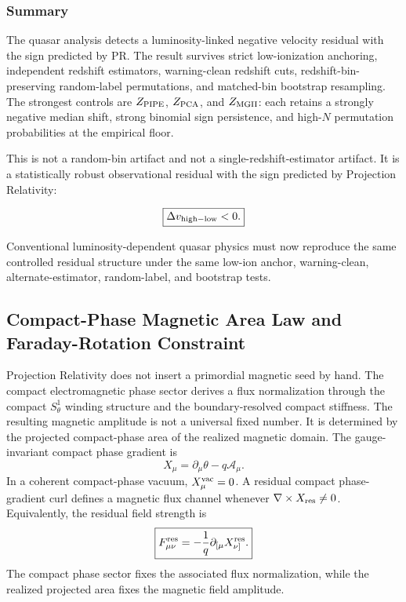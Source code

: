 \documentclass[11pt]{article}
\begin{document}
\subsubsection{Summary}

The quasar analysis detects a luminosity-linked negative velocity residual with the sign predicted by PR. The result survives strict low-ionization anchoring, independent redshift estimators, warning-clean redshift cuts, redshift-bin-preserving random-label permutations, and matched-bin bootstrap resampling. The strongest controls are \(Z_{\rm PIPE}\), \(Z_{\rm PCA}\), and \(Z_{\rm MGII}\): each retains a strongly negative median shift, strong binomial sign persistence, and high-\(N\) permutation probabilities at the empirical floor.

This is not a random-bin artifact and not a single-redshift-estimator artifact. It is a statistically robust observational residual with the sign predicted by Projection Relativity:

\begin{equation}
\boxed{
\Delta v_{\rm high-low}<0.}
\end{equation}

Conventional luminosity-dependent quasar physics must now reproduce the same controlled residual structure under the same low-ion anchor, warning-clean, alternate-estimator, random-label, and bootstrap tests.

\subsection{Compact-Phase Magnetic Area Law and Faraday-Rotation Constraint}
\label{sec:compact_phase_magnetic_area_law}

Projection Relativity does not insert a primordial magnetic seed by hand.
The compact electromagnetic phase sector derives a flux normalization through
the compact \(S^1_\theta\) winding structure and the boundary-resolved compact
stiffness. The resulting magnetic amplitude is not a universal fixed number.
It is determined by the projected compact-phase area of the realized magnetic
domain. The gauge-invariant compact phase gradient is
\begin{equation}
\boxed{
X_\mu
=
\partial_\mu\theta
-
q\mathcal A_\mu .
}
\end{equation}
In a coherent compact-phase vacuum, \(X_\mu^{\rm vac}=0\). A residual
compact phase-gradient curl defines a magnetic flux channel whenever
\(\nabla\times X_{\rm res}\neq0\). Equivalently, the residual field strength is
\begin{equation}
\boxed{
F_{\mu\nu}^{\rm res}
=
-\frac{1}{q}
\partial_{[\mu}X_{\nu]}^{\rm res}.
}
\end{equation}
The compact phase sector fixes the associated flux normalization, while the
realized projected area fixes the magnetic field amplitude.
\end{document}
